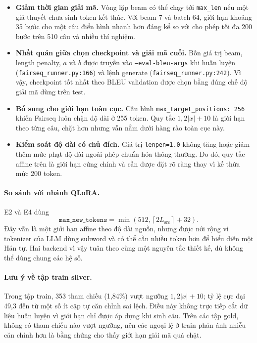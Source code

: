 \documentclass[11pt]{article}
\begin{document}
\begin{itemize}
  \item \textbf{Giảm thời gian giải mã.} Vòng lặp beam có thể chạy tới
  \texttt{max\_len} nếu một giả thuyết chưa sinh token kết thúc. Với beam 7 và
  batch 64, giới hạn khoảng 35 bước cho một câu điển hình nhanh hơn đáng kể so
  với cho phép tối đa 200 bước trên 510 câu và nhiều thí nghiệm.

  \item \textbf{Nhất quán giữa chọn checkpoint và giải mã cuối.} Bốn giá trị
  beam, length penalty, $a$ và $b$ được truyền vào
  \texttt{--eval-bleu-args} khi huấn luyện
  (\texttt{fairseq\_runner.py:166}) và lệnh generate
  (\texttt{fairseq\_runner.py:242}). Vì vậy, checkpoint tốt nhất theo BLEU
  validation được chọn bằng đúng chế độ giải mã dùng trên test.

  \item \textbf{Bổ sung cho giới hạn toàn cục.} Cấu hình
  \texttt{max\_target\_positions: 256} khiến Fairseq luôn chặn độ dài ở 255
  token. Quy tắc $1{,}2|x|+10$ là giới hạn theo từng câu, chặt hơn nhưng vẫn
  nằm dưới hàng rào toàn cục này.

  \item \textbf{Kiểm soát độ dài có chủ đích.} Giá trị
  \texttt{lenpen=1.0} không tăng hoặc giảm thêm mức phạt độ dài ngoài phép
  chuẩn hóa thông thường. Do đó, quy tắc affine trên là giới hạn cứng chính và
  cần được đặt rõ ràng thay vì kế thừa mức 200 token.
\end{itemize}

\paragraph{So sánh với nhánh QLoRA.}
E2 và E4 dùng
\[
  \texttt{max\_new\_tokens}
  =\min\!\left(512,\left\lceil2L_{\mathrm{src}}\right\rceil+32\right).
\]
Đây vẫn là một giới hạn affine theo độ dài nguồn, nhưng được nới rộng vì
tokenizer của LLM dùng subword và có thể cần nhiều token hơn để biểu diễn một
Hán tự. Hai backend vì vậy tuân theo cùng một nguyên tắc thiết kế, dù không thể
dùng chung các hệ số.

\paragraph{Lưu ý về tập train silver.}
Trong tập train, 353 tham chiếu (1,84\%) vượt ngưỡng $1{,}2|x|+10$; tỷ lệ cực
đại 49,3 đến từ một số ít cặp tự căn chỉnh sai lệch. Điều này không trực tiếp
cắt dữ liệu huấn luyện vì giới hạn chỉ được áp dụng khi sinh câu. Trên các tập
gold, không có tham chiếu nào vượt ngưỡng, nên các ngoại lệ ở train phản ánh
nhiễu căn chỉnh hơn là bằng chứng cho thấy giới hạn giải mã quá chặt.
\end{document}
